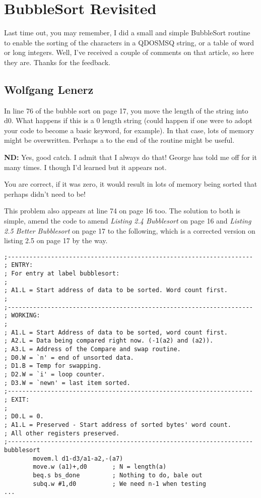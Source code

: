 \chapter{BubbleSort Revisited}
Last time out, you may remember, I did a small and simple BubbleSort routine to enable the sorting of the characters in a QDOSMSQ string, or a table of word or long integers. Well, I've received a couple of comments on that article, so here they are. Thanks for the feedback.

\section{Wolfgang Lenerz}


In line 76 of the bubble sort on page 17, you move the length of the string into d0. What happens if this is a 0 length string (could happen
if one were to adopt your code to become a basic keyword, for example). In that case, lots of memory might be overwritten. Perhaps a  to the
end of the routine might be useful.

\textbf{ND:} Yes, good catch. I admit that I always do that! George has told me off for it many times. I though I'd learned but it appears not.

You are correct, if it was zero, it would result in lots of memory being sorted that perhaps didn't need to be!

This problem also appears at line 74 on page 16 too. The solution to both is simple, amend the code to amend \emph{Listing 2.4 Bubblesort} on page 16 and \emph{Listing 2.5 Better Bubblesort} on page 17 to the following, which is a corrected version on listing 2.5 on page 17 by the way.

\begin{lstlisting}[firstnumber=51,caption={Better Bubblesort - Bug Fix 1a}]
;--------------------------------------------------------------------
; ENTRY:
; For entry at label bubblesort:
;
; A1.L = Start address of data to be sorted. Word count first.
;
;--------------------------------------------------------------------
; WORKING:
;
; A1.L = Start Address of data to be sorted, word count first.
; A2.L = Data being compared right now. (-1(a2) and (a2)).
; A3.L = Address of the Compare and swap routine.
; D0.W = `n' = end of unsorted data.
; D1.B = Temp for swapping.
; D2.W = `i' = loop counter.
; D3.W = `newn' = last item sorted.
;--------------------------------------------------------------------
; EXIT:
;
; D0.L = 0.
; A1.L = Preserved - Start address of sorted bytes' word count.
; All other registers preserved.
;--------------------------------------------------------------------
bubblesort
        movem.l d1-d3/a1-a2,-(a7)
        move.w (a1)+,d0       ; N = length(a)
        beq.s bs_done         ; Nothing to do, bale out
        subq.w #1,d0          ; We need n-1 when testing
...
\end{lstlisting}

